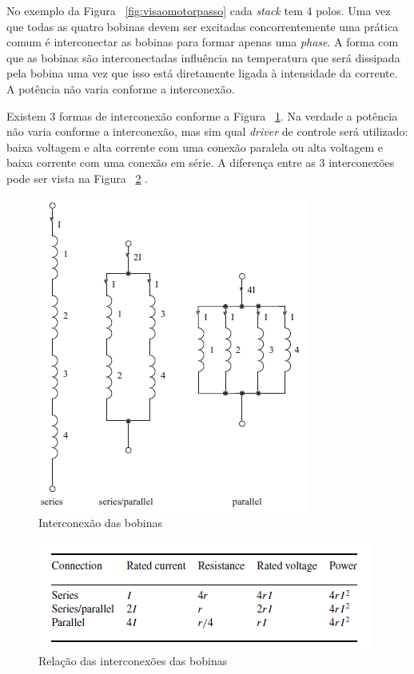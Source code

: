 No exemplo da Figura ~\ref{fig:visaomotorpasso} cada \emph{stack} tem 4 polos. Uma vez que todas as quatro bobinas devem ser excitadas concorrentemente uma prática comum é interconectar as bobinas para formar apenas uma \emph{phase}. A forma com que as bobinas são interconectadas influência na temperatura que será dissipada pela bobina uma vez que isso está diretamente ligada à intensidade da corrente. A potência não varia conforme a interconexão. 

Existem 3 formas de interconexão conforme a Figura ~\ref{fig:bobinas}. Na verdade a potência não varia conforme a interconexão, mas sim qual \emph{driver} de controle será utilizado: baixa voltagem e alta corrente com uma conexão paralela ou alta voltagem e baixa corrente com uma conexão em série. A diferença entre as 3 interconexões pode ser vista na Figura ~\ref{fig:relacaobobina} \cite{acarnley2002stepping}.

\begin{figure}[htp]
	\centering
	\includegraphics[scale=1]{images/bobinas.png}
	\caption{Interconexão das bobinas}	
	\label{fig:bobinas}	
\end{figure}

\begin{figure}[htp]
	\centering
	\includegraphics[scale=1]{images/relacao_bobina.png}
	\caption{Relação das interconexões das bobinas}	
	\label{fig:relacaobobina}	
\end{figure}

